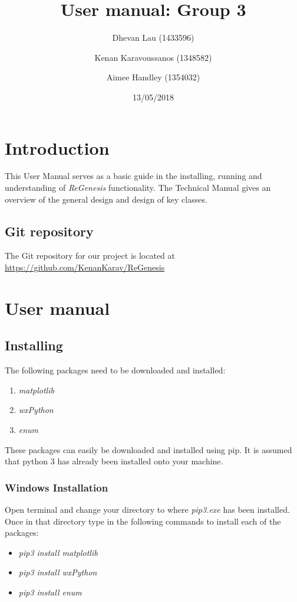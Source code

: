 \documentclass[11pt]{article}
\title{User manual: Group 3}
\author{Dhevan Lau (1433596) \and Kenan Karavoussanos (1348582) \and Aimee Handley (1354032)}
\date{13/05/2018}
\begin{document}
\maketitle

\section{Introduction}
This User Manual serves as a basic guide in the installing, running and understanding of \textit{ReGenesis} functionality. 
The Technical Manual gives an overview of the general design and design of key classes. 

\subsection*{Git repository}

The Git repository for our project is located at \url{https://github.com/KenanKarav/ReGenesis}

\section{User manual}

\subsection{Installing}
The following packages need to be downloaded and installed:
\begin{enumerate}
\item \textit{matplotlib}
\item \textit{wxPython}
\item \textit{enum}
\end{enumerate}


\noindent These packages can easily be downloaded and installed using pip. It is assumed that python 3 has already been installed onto your machine.

\subsubsection{Windows Installation}
Open terminal and change your directory to where \textit{pip3.exe} has been installed. Once in that directory type in the following commands to install each of the packages:

\begin{itemize}
\item \textit{pip3 install matplotlib}
\item \textit{pip3 install wxPython}
\item \textit{pip3 install enum}
\end{itemize}
\end{document}
